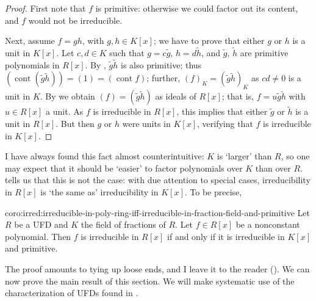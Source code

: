 \begin{proof}
  First note that $f$ is primitive: otherwise we could factor out its
  content, and $f$ would not be irreducible.

  Next, assume $f = gh$, with $g, h \in K[x]$; we have to prove that
  either $g$ or $h$ is a unit in $K[x]$. Let $c, d \in K$ such that
  $g = c\tilde{g}$, $h = d\tilde{h}$, and $\tilde{g}$, $\tilde{h}$ are
  primitive polynomials in $R[x]$. By ,
  $\tilde{g}\tilde{h}$ is also primitive; thus
  $(\operatorname{cont}(\tilde{g}\tilde{h})) = (1) =
  (\operatorname{cont} f)$; further, $(f)_K = (\tilde{g}\tilde{h})_K$
  as $cd \neq 0$ is a unit in $K$. By  we obtain
  $(f) = (\tilde{g}\tilde{h})$ as ideals of $R[x]$; that is,
  $f = u\tilde{g}\tilde{h}$ with $u \in R[x]$ a unit.  As $f$ is
  irreducible in $R[x]$, this implies that either $\tilde{g}$ or
  $\tilde{h}$ is a unit in $R[x]$. But then $g$ or $h$ were units in
  $K[x]$, verifying that $f$ is irreducible in $K[x]$.
\end{proof}
I have always found this fact almost counterintuitive: $K$ is `larger'
than $R$, so one may expect that it should be `easier' to factor
polynomials over $K$ than over $R$.  tells us
that this is not the case: with due attention to special cases,
irreducibility in $R[x]$ is `the same as' irreducibility in $K[x]$. To
be precise,

\begin{coro}{}{coro:irred:irreducible-in-poly-ring-iff-irreducible-in-fraction-field-and-primitive}
  Let $R$ be a UFD and $K$ the field of fractions of $R$. Let
  $f \in R[x]$ be a nonconstant polynomial. Then $f$ is irreducible in
  $R[x]$ if and only if it is irreducible in $K[x]$ and primitive.
\end{coro}

The proof amounts to tying up loose ends, and I leave it to the reader
().  We can now
prove the main result of this section. We will make systematic use of
the characterization of UFDs found in .

